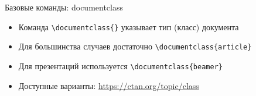 \begin{frame}[fragile]{Базовые команды: documentclass}

\begin{itemize}
    \item Команда \lstinline!\documentclass{}! указывает тип (класс) документа
    \item Для большинства случаев достаточно \lstinline!\documentclass{article}!
    \item Для презентаций используется \lstinline!\documentclass{beamer}!
    \item Доступные варианты: {\color{blue} \url{https://ctan.org/topic/class}}
\end{itemize}

\end{frame}